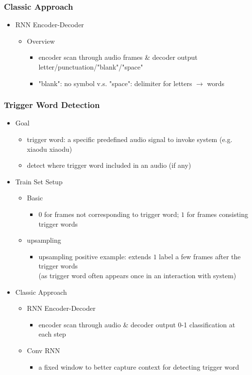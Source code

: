 \subsubsection{Classic Approach}
\begin{itemize}
\item RNN Encoder-Decoder
	\begin{itemize}
	\item Overview
		\begin{itemize}
		\item encoder scan through audio frames \& decoder output letter/punctuation/"blank"/"space"
		\item "blank": no symbol v.s. "space": delimiter for letters $\rightarrow$ words
		\end{itemize}
	\end{itemize}
\end{itemize}

\subsubsection{Trigger Word Detection}
\begin{itemize}
\item Goal
	\begin{itemize}
	\item trigger word: a specific predefined audio signal to invoke system (e.g. xiaodu xiaodu)
	\item detect where trigger word included in an audio (if any)
	\end{itemize}
\item Train Set Setup
	\begin{itemize}
	\item Basic
		\begin{itemize}
		\item $0$ for frames not corresponding to trigger word; $1$ for frames consisting trigger words
		\end{itemize}
	\item upsampling
		\begin{itemize}
		\item upsampling positive example: extends $1$ label a few frames after the trigger words \\
		(as trigger word often appears once in an interaction with system)
		\end{itemize}
	\end{itemize}
\item Classic Approach
	\begin{itemize}
	\item RNN Encoder-Decoder
		\begin{itemize}
		\item encoder scan through audio \& decoder output 0-1 classification at each step
		\end{itemize}
	\item Conv RNN
		\begin{itemize}
		\item a fixed window to better capture context for detecting trigger word
		\end{itemize}
	\end{itemize}
\end{itemize}

